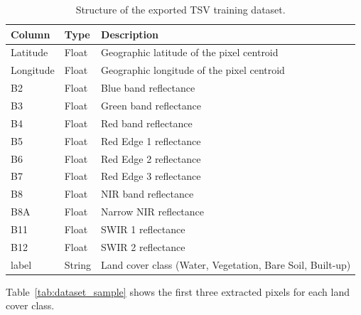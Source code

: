 \documentclass{article}
\begin{document}
\begin{table}[h]
    \centering
    \caption{Structure of the exported TSV training dataset.}
    \label{tab:tsv_structure}
    \begin{tabular}{lll}
        \hline
        \textbf{Column} & \textbf{Type} & \textbf{Description} \\
        \hline
        Latitude  & Float  & Geographic latitude of the pixel centroid \\
        Longitude & Float  & Geographic longitude of the pixel centroid \\
        B2        & Float  & Blue band reflectance \\
        B3        & Float  & Green band reflectance \\
        B4        & Float  & Red band reflectance \\
        B5        & Float  & Red Edge 1 reflectance \\
        B6        & Float  & Red Edge 2 reflectance \\
        B7        & Float  & Red Edge 3 reflectance \\
        B8        & Float  & NIR band reflectance \\
        B8A       & Float  & Narrow NIR reflectance \\
        B11       & Float  & SWIR 1 reflectance \\
        B12       & Float  & SWIR 2 reflectance \\
        label     & String & Land cover class (Water, Vegetation, Bare Soil, Built-up) \\
        \hline
    \end{tabular}
\end{table}

Table~\ref{tab:dataset_sample} shows the first three extracted pixels for each land cover class.
\end{document}
